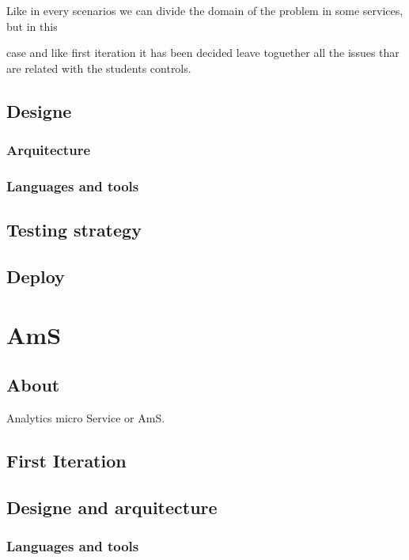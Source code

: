 \documentclass[oneside,english,titlepage]{scrbook}
\begin{document}
Like in every scenarios we can divide the domain of the problem in
some services, but in this

case and like first iteration it has been decided leave toguether
all the issues thar are related with the students controls.

\subsection{Designe}

\subsubsection{Arquitecture}

\subsubsection{Languages and tools}

\subsection{Testing strategy}

\subsection{Deploy}

\section{AmS}

\subsection{About}

Analytics micro Service or AmS.

\subsection{First Iteration}

\subsection{Designe and arquitecture}



\subsubsection{Languages and tools}
\end{document}
